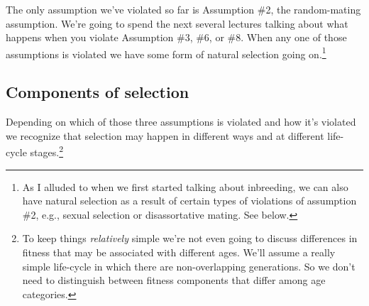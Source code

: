 \documentclass[12pt]{article}
\begin{document}
The only assumption we've violated so far is Assumption \#2, the
random-mating assumption. We're going to spend the next several
lectures talking about what happens when you violate Assumption \#3,
\#6, or \#8. When any one of those assumptions is violated we have
some form of natural selection going on.\footnote{As I alluded to when
  we first started talking about inbreeding, we can also have natural
  selection as a result of certain types of violations of assumption
  \#2, e.g., sexual selection or disassortative mating. See
  below.}

\subsection*{Components of selection}

Depending on which of those three assumptions is violated and how it's
violated we recognize that selection may happen in different ways and
at different life-cycle stages.\footnote{To keep things {\it
    relatively\/} simple we're not even going to discuss differences
  in fitness that may be associated with different ages. We'll assume
  a really simple life-cycle in which there are non-overlapping
  generations. So we don't need to distinguish between fitness
  components that differ among age categories.}
\end{document}
